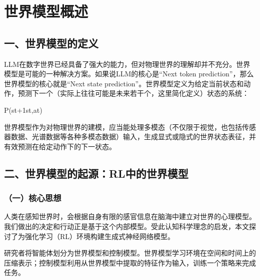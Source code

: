\setcounter{section}{0}

\hypertarget{ux4e16ux754cux6a21ux578bux6982ux8ff0}{%
\section{世界模型概述}\label{ux4e16ux754cux6a21ux578bux6982ux8ff0}}

\hypertarget{ux4e00ux4e16ux754cux6a21ux578bux7684ux5b9aux4e49}{%
\subsection{一、世界模型的定义}\label{ux4e00ux4e16ux754cux6a21ux578bux7684ux5b9aux4e49}}

LLM在数字世界已经具备了强大的能力，但对物理世界的理解却并不充分。世界模型是可能的一种解决方案。如果说LLM的核心是``Next token prediction''，那么世界模型的核心就是``Next state prediction''。世界模型定义为给定当前状态和动作，预测下一个（实际上往往可能是未来若干个，这里简化定义）状态的系统：

P(st+1\textbar st,at)

世界模型作为对物理世界的建模，应当能处理多模态（不仅限于视觉，也包括传感器数据、光谱数据等各种多模态数据）输入，生成显式或隐式的世界状态表征，并有效预测在给定动作下的下一状态。

\hypertarget{ux4e8cux4e16ux754cux6a21ux578bux7684ux8d77ux6e90rlux4e2dux7684ux4e16ux754cux6a21ux578b}{%
\subsection{二、世界模型的起源：RL中的世界模型}\label{ux4e8cux4e16ux754cux6a21ux578bux7684ux8d77ux6e90rlux4e2dux7684ux4e16ux754cux6a21ux578b}}

\hypertarget{ux4e00ux6838ux5fc3ux601dux60f3-17}{%
\subsubsection{（一）核心思想}\label{ux4e00ux6838ux5fc3ux601dux60f3-17}}

人类在感知世界时，会根据自身有限的感官信息在脑海中建立对世界的心理模型。我们做出的决定和行动正是基于这个内部模型。受此认知科学理念的启发，本文探讨了为强化学习（RL）环境构建生成式神经网络模型。

研究者将智能体划分为世界模型和控制模型。世界模型学习环境在空间和时间上的压缩表示；控制模型利用从世界模型中提取的特征作为输入，训练一个策略来完成任务。

